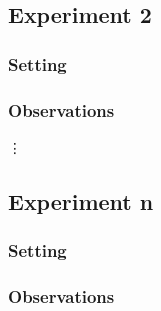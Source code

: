 \documentclass[11pt]{article}
\begin{document}
\subsection{Experiment 2}

\subsubsection{Setting}

\subsubsection{Observations}

\vdots

\subsection{Experiment n}

\subsubsection{Setting}

\subsubsection{Observations}
\end{document}
